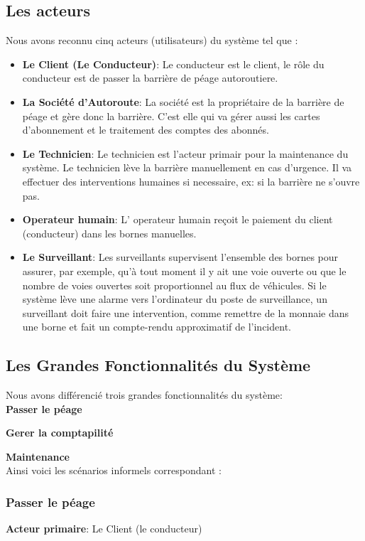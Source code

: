 \subsection{Les acteurs} 
Nous avons reconnu cinq acteurs (utilisateurs) du système tel que :
\begin{itemize}
    \item \textbf{Le Client (Le Conducteur)}: Le conducteur est le client, le rôle du conducteur est de passer la barrière de péage autoroutiere. 
    \item \textbf{La Société d’Autoroute}: 	La société est la propriétaire de la barrière de péage et gère donc la barrière. C’est elle qui va gérer aussi les cartes d’abonnement et le traitement des comptes des abonnés. 
    \item \textbf{Le Technicien}: Le technicien est l’acteur primair pour la maintenance du système. Le technicien lève la barrière manuellement en cas d’urgence. Il va effectuer des interventions humaines si necessaire, ex: si la barrière ne s’ouvre pas. 
    \item \textbf{Operateur humain}: L’ operateur humain reçoit le paiement du client (conducteur) dans les bornes manuelles.
    \item \textbf{Le Surveillant}: Les surveillants supervisent l’ensemble des bornes pour assurer, par exemple, qu’à tout moment il y ait une voie ouverte ou que le nombre de voies ouvertes soit proportionnel au flux de véhicules. Si le système lève une alarme vers l’ordinateur du poste de surveillance, un surveillant doit faire une intervention, comme remettre de la monnaie dans une borne et fait un compte-rendu approximatif de l’incident.
\end{itemize}
\newpage

\subsection{Les Grandes Fonctionnalités du Système}
Nous avons différencié trois grandes fonctionnalités du système:\\

\textbf{Passer le péage }%

\textbf{Gerer la comptapilité } %

\textbf{Maintenance }%
\\

Ainsi voici les scénarios informels correspondant :
\subsubsection{\textbf{Passer le péage }} \label{subsubsec:passerL} 
\textbf{Acteur primaire}: Le Client (le conducteur) 

